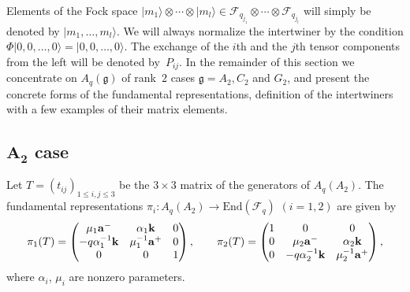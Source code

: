 Elements of the Fock space
$|m_1\rangle \otimes \cdots \otimes |m_l\rangle
\in \mathcal{F}_{q_{j_1}}\otimes \cdots \otimes \mathcal{F}_{q_{j_l}}$
will simply be denoted by
$|m_1, \ldots, m_l\rangle$.
We will always normalize the intertwiner by the condition
$\Phi |0,0,\ldots, 0\rangle =  |0,0,\ldots, 0\rangle$.
The exchange of the $i$th and the $j$th tensor components from the left
will be denoted by~$P_{ij}$.
In the remainder of this section we concentrate on
$A_q(\mathfrak{g})$ of rank~$2$ cases
$\mathfrak{g}=A_2, C_2$ and $G_2$,
and present the concrete forms of the
fundamental representations,
def\/inition of the intertwiners with
a few examples of their matrix elements.

\subsection[$A_2$ case]{$\boldsymbol{A_2}$ case}\label{a:ss:a2}

Let $T=(t_{ij})_{1\le i,j \le 3}$ be the
$3\times 3$ matrix of the generators of $A_q(A_2)$.
The fundamental representations
$\pi_i: A_q(A_2) \rightarrow \mathrm{End}(\mathcal{F}_q)$
$(i=1,2)$ are given by
\begin{gather}\label{a:piTa}
\pi_1(T) =
\begin{pmatrix}
\mu_1{\rm {\bf a}}^- &  \alpha_1{\rm {\bf k}} & 0 \\
-q\alpha^{-1}_1{\rm {\bf k}} & \mu^{-1}_1{\rm {\bf a}}^+ & 0\\
0 & 0 & 1
\end{pmatrix},
\qquad
\pi_2(T) =
\begin{pmatrix}
1 & 0 & 0\\
0 & \mu_2{\rm {\bf a}}^- &  \alpha_2{\rm {\bf k}}\\
0 & -q\alpha^{-1}_2{\rm {\bf k}} & \mu^{-1}_2{\rm {\bf a}}^+
\end{pmatrix},
\end{gather}
where $\alpha_i$, $\mu_i$ are nonzero parameters.

